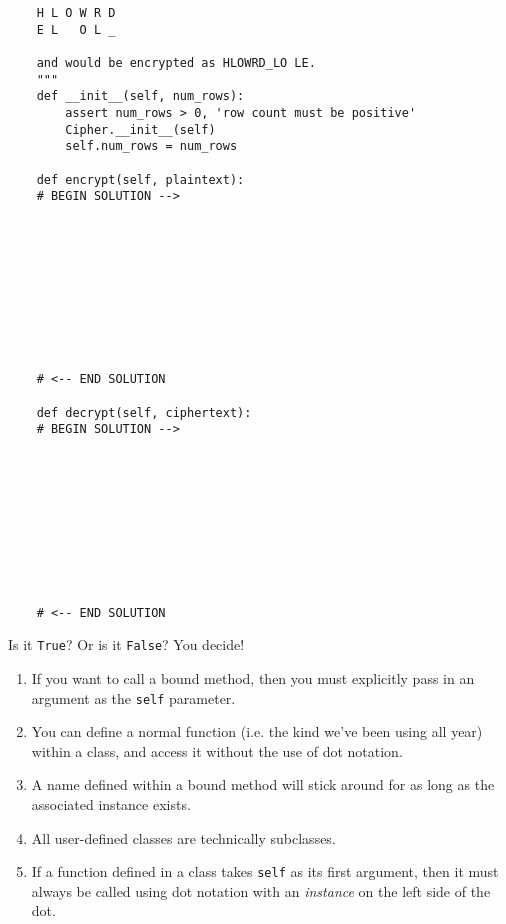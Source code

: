 \documentclass[twoside]{article}
\begin{document}
\begin{enumerate}
\begin{lstlisting}
    H L O W R D
    E L   O L _
    
    and would be encrypted as HLOWRD_LO LE.
    """
    def __init__(self, num_rows):
        assert num_rows > 0, 'row count must be positive'
        Cipher.__init__(self)
        self.num_rows = num_rows
    
    def encrypt(self, plaintext):
    # BEGIN SOLUTION -->










    # <-- END SOLUTION   
    
    def decrypt(self, ciphertext):
    # BEGIN SOLUTION -->
    
    
    
    
    
    
    



    # <-- END SOLUTION
\end{lstlisting}


Is it \texttt{True}? Or is it \texttt{False}? You decide!
\vspace{0.1in}

\begin{enumerate}
\item If you want to call a bound method, then you must explicitly pass in an argument as the \texttt{self} parameter.\\

\item You can define a normal function (i.e. the kind we've been using all year) within a class, and access it without the use of dot notation.\\

\item A name defined within a bound method will stick around for as long as the associated instance exists.\\

\item All user-defined classes are technically subclasses.\\

\item If a function defined in a class takes \texttt{self} as its first argument, then it must always be called using dot notation with an \textit{instance} on the left side of the dot.\\


\end{enumerate}
\end{enumerate}
\end{document}
